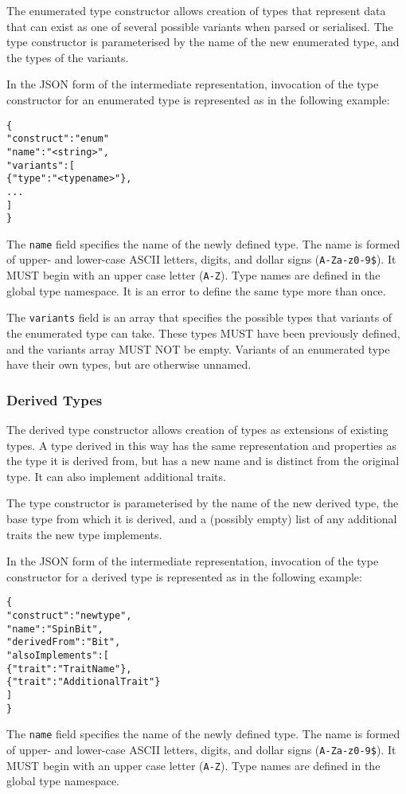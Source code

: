 \documentclass[10pt,twocolumn,a4paper]{article}
\newcommand{\code}[1]{\texttt{#1}}
\begin{document}
The enumerated type constructor allows creation of types that represent
data that can exist as one of several possible variants when parsed or
serialised. The type constructor is parameterised by the name of the new
enumerated type, and the types of the variants.

In the JSON form of the intermediate representation, invocation of the type
constructor for an enumerated type is represented as in the following example:
\footnotesize
\begin{alltt}
  \{
    "construct"   : "enum"
    "name"        : "<string>",
    "variants"    : [
      \{"type" : "<typename>"\},
      ...
    ]
  \}
\end{alltt}
\normalsize
The \code{name} field specifies the name of the newly defined type. The
name is formed of upper- and lower-case ASCII letters, digits, and dollar
signs (\code{A-Za-z0-9\$}).  It MUST begin with an upper case letter
(\code{A-Z}). Type names are defined in the global type namespace.
It is an error to define the same type more than once.

The \code{variants} field is an array that specifies the possible types
that variants of the enumerated type can take. These types MUST have been
previously defined, and the variants array MUST NOT be empty. Variants of
an enumerated type have their own types, but are otherwise unnamed.

\subsubsection{Derived Types}

The derived type constructor allows creation of types as extensions of
existing types. A type derived in this way has the same representation
and properties as the type it is derived from, but has a new name and is
distinct from the original type. It can also implement additional traits.

The type constructor is parameterised by the name of the new derived type,
the base type from which it is derived, and a (possibly empty) list of any
additional traits the new type implements.

In the JSON form of the intermediate representation, invocation of the
type constructor for a derived type is represented as in the following
example:
\footnotesize
\begin{alltt}
  \{
    "construct"   : "newtype",
    "name"        : "SpinBit",
    "derivedFrom" : "Bit",
    "alsoImplements" : [
      \{"trait" : "TraitName"\},
      \{"trait" : "AdditionalTrait"\}
    ]
  \}
\end{alltt}
\normalsize
The \code{name} field specifies the name of the newly defined type. The
name is formed of upper- and lower-case ASCII letters, digits, and dollar
signs (\code{A-Za-z0-9\$}).  It MUST begin with an upper case letter
(\code{A-Z}). Type names are defined in the global type namespace.
\end{document}
